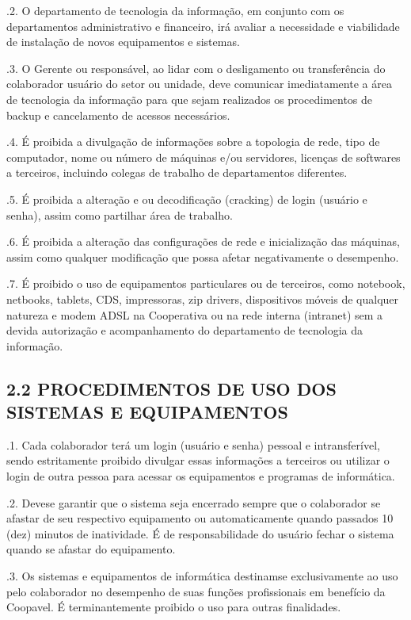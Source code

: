 \documentclass[letterpaper,10pt,brazil]{sphinxmanual}
\begin{document}
.2. O departamento de tecnologia da informação, em conjunto com os departamentos
administrativo e financeiro, irá avaliar a necessidade e viabilidade de instalação de novos
equipamentos e sistemas.

.3. O Gerente ou responsável, ao lidar com o desligamento ou transferência do
colaborador usuário do setor ou unidade, deve comunicar imediatamente a área de
tecnologia da informação para que sejam realizados os procedimentos de backup e
cancelamento de acessos necessários.

.4. É proibida a divulgação de informações sobre a topologia de rede, tipo de
computador, nome ou número de máquinas e/ou servidores, licenças de softwares a
terceiros, incluindo colegas de trabalho de departamentos diferentes.

.5. É proibida a alteração e ou decodificação (cracking) de login (usuário e senha),
assim como partilhar área de trabalho.

.6. É proibida a alteração das configurações de rede e inicialização das máquinas,
assim como qualquer modificação que possa afetar negativamente o desempenho.

.7. É proibido o uso de equipamentos particulares ou de terceiros, como notebook,
netbooks, tablets, CDS, impressoras, zip drivers, dispositivos móveis de qualquer
natureza e modem ADSL na Cooperativa ou na rede interna (intranet) sem a devida
autorização e acompanhamento do departamento de tecnologia da informação.


\subsection{2.2 PROCEDIMENTOS DE USO DOS SISTEMAS E EQUIPAMENTOS}
\label{\detokenize{regras:id2}}
.1. Cada colaborador terá um login (usuário e senha) pessoal e intransferível, sendo
estritamente proibido divulgar essas informações a terceiros ou utilizar o login de outra
pessoa para acessar os equipamentos e programas de informática.

.2. Deve\sphinxhyphen{}se garantir que o sistema seja encerrado sempre que o colaborador se afastar
de seu respectivo equipamento ou automaticamente quando passados 10 (dez) minutos de
inatividade. É de responsabilidade do usuário fechar o sistema quando se afastar do
equipamento.

.3. Os sistemas e equipamentos de informática destinam\sphinxhyphen{}se exclusivamente ao uso pelo
colaborador no desempenho de suas funções profissionais em benefício da Coopavel. É
terminantemente proibido o uso para outras finalidades.
\end{document}
